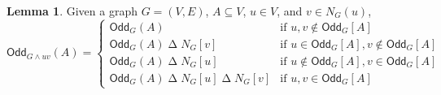 \documentclass[a4paper,onecolumn,superscriptaddress,11pt,accepted=2020-04-27]{quantumarticle}
\newcommand{\symd}{\mathbin{\Delta}\xspace}
\newcommand{\odd}[2]{\textsf{Odd}_{#1}\left(#2\right)}
\newcommand{\codd}[2]{\textsf{Odd}_{#1}\left[#2\right]}
\theoremstyle{definition}
\newtheorem{lemma}[theorem]{Lemma}
\begin{document}
\begin{lemma}\label{lem:oddneighbourspivot}
Given a graph $G=(V,E)$, $A\subseteq V$, $u \in V$, and $v\in N_G(u)$,
\begin{equation}\label{eq:odd-after-pivot}
\odd {G\wedge uv} A = 
\begin{cases}
  \odd G A & \text{if $u,v\notin \codd G A$}\\
  \odd G {A} \symd N_G[v]&\text{if $u\in \codd G A, v\notin \codd G A$}\\
  \odd G {A} \symd N_G[u]&\text{if $u\notin \codd G A, v\in \codd G A$}\\
  \odd G A \symd N_G[u]\symd N_G[v]& \text{if $u,v\in \codd G A$}
\end{cases}
\end{equation} 
\end{lemma}
\end{document}
